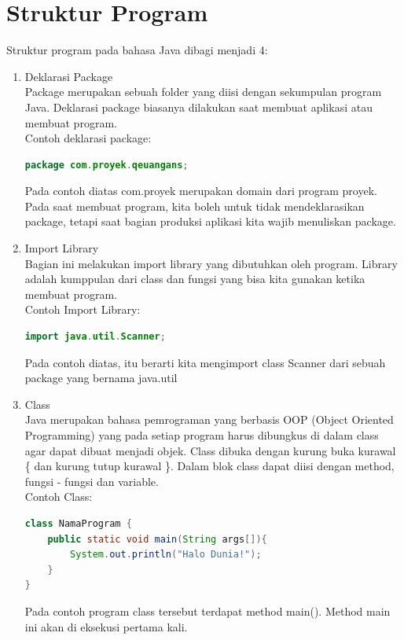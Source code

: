 \section{Struktur Program}
Struktur program pada bahasa Java dibagi menjadi 4:
\begin{enumerate}
    \item Deklarasi Package\\
    Package merupakan sebuah folder yang diisi dengan  sekumpulan program Java. Deklarasi package biasanya dilakukan saat membuat aplikasi atau membuat program.\\
    Contoh deklarasi package:
    \begin{lstlisting}[language=Java]
package com.proyek.qeuangans;
    \end{lstlisting}
    Pada contoh diatas \textcolor{pred}{com.proyek} merupakan domain dari program proyek. Pada saat membuat program, kita boleh untuk tidak mendeklarasikan package, tetapi saat bagian produksi aplikasi kita wajib menuliskan package.

    \item Import Library\\
    Bagian ini melakukan import library yang dibutuhkan oleh program. Library adalah kumppulan dari class dan fungsi yang bisa kita gunakan ketika membuat program.\\
    Contoh Import Library:
    \begin{lstlisting}[language=Java]
import java.util.Scanner;
    \end{lstlisting}
    Pada contoh diatas, itu berarti kita mengimport class \textcolor{pred}{Scanner} dari sebuah package yang bernama \textcolor{pred}{java.util}

    \item Class\\
    Java merupakan bahasa pemrograman yang berbasis OOP (Object Oriented Programming) yang pada setiap program harus dibungkus di dalam class agar dapat dibuat menjadi objek. Class dibuka dengan kurung buka kurawal \{ dan kurung tutup kurawal \}. Dalam blok class dapat diisi dengan method, fungsi - fungsi dan variable.\\
    Contoh Class:
    \begin{lstlisting}[language=Java]
class NamaProgram {
    public static void main(String args[]){
        System.out.println("Halo Dunia!");
    }
}
    \end{lstlisting}
    Pada contoh program class tersebut terdapat method \textcolor{pred}{main()}. Method main ini akan di eksekusi pertama kali.


\end{enumerate}
